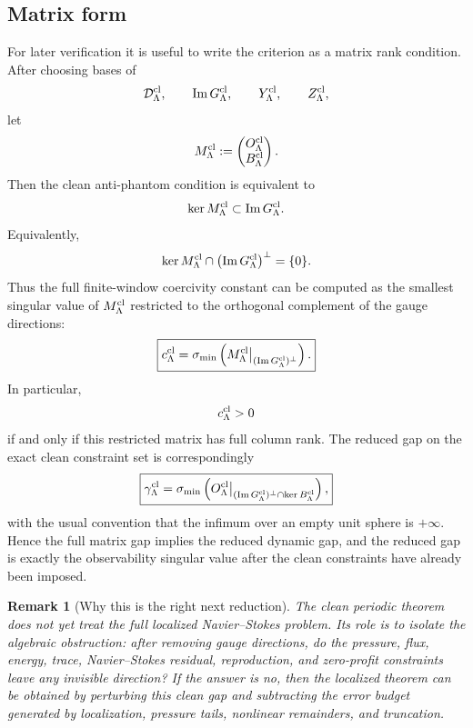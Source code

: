\documentclass[11pt]{article}
\numberwithin{equation}{section}
\newtheorem{remark}[theorem]{Remark}
\begin{document}
\subsection{Matrix form}

For later verification it is useful to write the criterion as a matrix
rank condition.  After choosing bases of
\[
        \mathcal D_\Lambda^{\rm cl},
        \qquad
        \operatorname{Im}G_\Lambda^{\rm cl},
        \qquad
        Y_\Lambda^{\rm cl},
        \qquad
        Z_\Lambda^{\rm cl},
\]
let
\[
        M_\Lambda^{\rm cl}
        :=
        \begin{pmatrix}
        O_\Lambda^{\rm cl}\\
        B_\Lambda^{\rm cl}
        \end{pmatrix}.
\]
Then the clean anti-phantom condition is equivalent to
\[
        \ker M_\Lambda^{\rm cl}
        \subset
        \operatorname{Im}G_\Lambda^{\rm cl}.
\]
Equivalently,
\[
        \ker M_\Lambda^{\rm cl}
        \cap
        \bigl(\operatorname{Im}G_\Lambda^{\rm cl}\bigr)^\perp
        =
        \{0\}.
\]
Thus the full finite-window coercivity constant can be computed as the
smallest singular value of \(M_\Lambda^{\rm cl}\) restricted to the
orthogonal complement of the gauge directions:
\[
\boxed{
        c_\Lambda^{\rm cl}
        =
        \sigma_{\min}
        \left(
        M_\Lambda^{\rm cl}
        \big|_{(\operatorname{Im}G_\Lambda^{\rm cl})^\perp}
        \right).
}
\]
In particular,
\[
        c_\Lambda^{\rm cl}>0
\]
if and only if this restricted matrix has full column rank.  The reduced
gap on the exact clean constraint set is correspondingly
\[
\boxed{
        \gamma_\Lambda^{\rm cl}
        =
        \sigma_{\min}
        \left(
        O_\Lambda^{\rm cl}
        \big|_{(\operatorname{Im}G_\Lambda^{\rm cl})^\perp
        \cap\ker B_\Lambda^{\rm cl}}
        \right),
}
\]
with the usual convention that the infimum over an empty unit sphere is
\(+\infty\).  Hence the full matrix gap implies the reduced dynamic gap,
and the reduced gap is exactly the observability singular value after the
clean constraints have already been imposed.

\begin{remark}[Why this is the right next reduction]
The clean periodic theorem does not yet treat the full localized
Navier--Stokes problem.  Its role is to isolate the algebraic obstruction:
after removing gauge directions, do the pressure, flux, energy, trace,
Navier--Stokes residual, reproduction, and zero-profit constraints leave
any invisible direction?  If the answer is no, then the localized theorem
can be obtained by perturbing this clean gap and subtracting the error
budget generated by localization, pressure tails, nonlinear remainders,
and truncation.
\end{remark}
\end{document}

